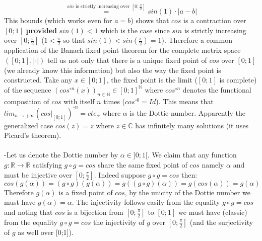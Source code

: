 \documentclass[11pt, a4paper, oneside]{article}
\theoremstyle{remark}
\theoremstyle{lemma}
\begin{document}
$$\overset{sin\text{ is strictly increasing over } [0;\frac{\pi}{2}]}{=}sin(1)\cdot|a-b|$$
This bounds (which works even for $a=b$) shows that $cos$ is a contraction over $[0;1]$ \textbf{provided} $sin(1)<1$ which is the case since $sin$ is strictly increasing over $[0;\frac{\pi}{2}]$ ($1<\frac{\pi}{2}$ so that $sin(1)<sin(\frac{\pi}{2})=1$). Therefore a common application of the Banach fixed point theorem for the complete metrix space $([0;1],|\cdot|)$ tell us not only that there is a unique fixed point of $cos$ over $[0;1]$ (we already know this information) but also the way the fixed point is constructed. Take any $x\in[0;1]$, the fixed point is the limit ($[0;1]$ is  complete) of the sequence $(cos^{\circ n}(x))_{n\in\mathbb{N}}\in[0;1]^{\mathbb{N}}$ where $cos^{\circ n}$ denotes the functional composition of $cos$ with itself $n$ times ($cos^{\circ 0}=Id$). This means that $lim _{n\rightarrow+\infty}(cos|_{[0;1]})^{\circ n}=cte_{\alpha}$ where $\alpha$ is the Dottie number. Apparently the generalized case 
$cos(z)=z$ where $z\in\mathbb{C}$ has infinitely many solutions (it uses Picard's theorem).
\\\\
-Let us denote the Dottie number by $\alpha\in]0;1[$. We claim that any function $g:\mathbb{R}\rightarrow\mathbb{R}$ satisfying $g\circ g=cos$ share the same fixed point of $cos$ namely $\alpha$ and must be injective over $[0;\frac{\pi}{2}]$. Indeed suppose $g\circ g= cos$ then:
$$cos(g(\alpha))=(g\circ g)(g(\alpha))=g((g\circ g)(\alpha))=g(cos(\alpha))=g(\alpha)$$
Therefore $g(\alpha)$ is a fixed point of $cos$, by the unicity of the Dottie number we must have $g(\alpha)=\alpha$. The injectivity follows easily from the equality $g\circ g=cos$ and noting that $cos$ is a bijection from $[0;\frac{\pi}{2}]$ to $[0;1]$ we must have (classic) from the equality $g\circ g=cos$ the injectivity of $g$ over $[0;\frac{\pi}{2}]$ (and the surjectivity of $g$ as well over [0;1]).
\\\\
\end{document}
